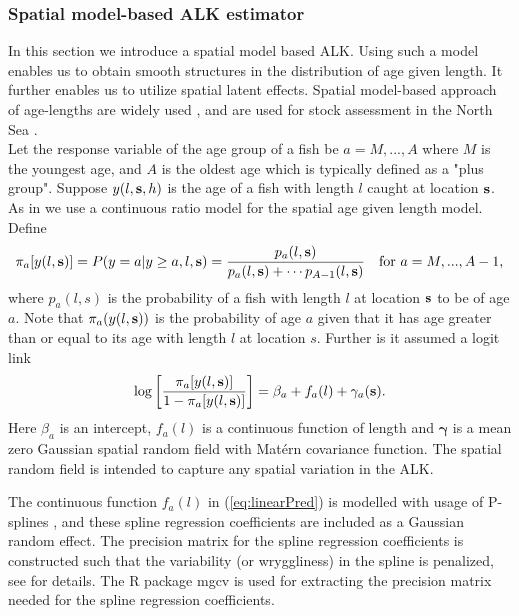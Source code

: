\documentclass[a4paper 12pt]{article}
\numberwithin{equation}{section}
\begin{document}
\subsubsection{Spatial model-based ALK estimator}
\label{sec:spatialModelALK}
In this section we introduce a spatial model based ALK. Using such a model enables us to obtain smooth structures in the distribution of age given length. It further enables us to utilize spatial latent effects. Spatial model-based approach of age-lengths are widely used \citep{berg2012spatial, hirst2012bayesian, rindorf2001analyses}, and are used for stock assessment in the North Sea \citep{berg2014evaluation}. \\ %
\indent Let the response variable of the age group of a fish be $a = M,...,A$ where $M$ is the youngest age, and $A$ is the oldest age which is typically defined as a "plus group". Suppose $y(l,{\bf s},h)$ is the age  of a fish with length $l$ caught at location ${\bf s}$. As in \citet{berg2012spatial} we use a continuous ratio model for the spatial age given length model. Define
\begin{align}\label{eq:linearPred1}
\pi_a[y(l,{\bf s})] = P(y = a|y \geq a, l, {\bf s}) = \frac{p_a(l,{\bf s})}{p_a(l,{\bf s}) + \cdots p_{A-1}(l,{\bf s})} \vspace{ 4mm} \ \ \ \text{for } a =M,...,A-1 ,
\end{align}
where $p_a(l,s)$ is the probability of a fish with length $l$ at location ${\bf s}$ to be of age $a$. Note that $\pi_a(y(l,{\bf s}))$ is the probability of age $a$ given that it has age greater than or equal to its age with length $l$ at location $s$. Further is it assumed a logit link
\begin{align}\label{eq:linearPred}
\log \left[ \frac{\pi_a[y(l,{\bf s})]}{1-\pi_a[y(l,{\bf s})]}\right] = \beta_a +  f_a(l) + \gamma_a({\bf s}).
\end{align}
Here $\beta_a$ is an intercept, $ f_a(l)$ is a continuous function of length and $\pmb{\gamma}$ is a mean zero Gaussian spatial random field with Mat\'{e}rn covariance function. The spatial random field is intended to capture any spatial variation in the ALK.

The continuous function $f_a(l)$ in (\ref{eq:linearPred}) is modelled with usage of P-splines \citep{wood2017generalized}, and these spline regression coefficients are included as a Gaussian random effect. The precision matrix for the spline regression coefficients is constructed such that the variability (or wryggliness) in the spline is penalized, see \citet[page 239]{wood2017generalized} for details. The R package mgcv \citep{wood2015package} is used for extracting the precision matrix needed for the spline regression coefficients.
\end{document}
